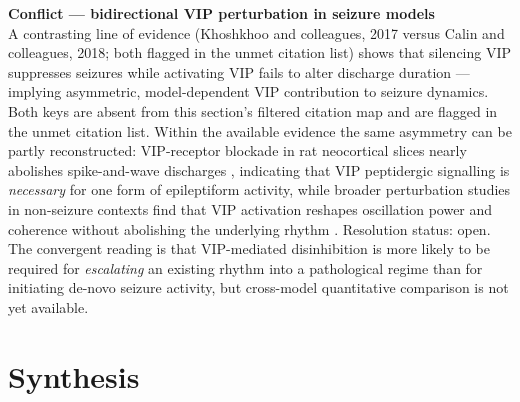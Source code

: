 \documentclass[11pt]{article}
\begin{document}
\begin{framed}
\textbf{Conflict --- bidirectional VIP perturbation in seizure models}\\
A contrasting line of evidence (Khoshkhoo and colleagues, 2017 versus Calin and colleagues, 2018; both flagged in the unmet citation list) shows that silencing VIP suppresses seizures while activating VIP fails to alter discharge duration --- implying asymmetric, model-dependent VIP contribution to seizure dynamics. Both keys are absent from this section's filtered citation map and are flagged in the unmet citation list. Within the available evidence the same asymmetry can be partly reconstructed: VIP-receptor blockade in rat neocortical slices nearly abolishes spike-and-wave discharges \citep{Hall2015}, indicating that VIP peptidergic signalling is \textit{necessary} for one form of epileptiform activity, while broader perturbation studies in non-seizure contexts find that VIP activation reshapes oscillation power and coherence without abolishing the underlying rhythm \citep{Veit2023, Bastos2023a, Sabri2024}. Resolution status: open. The convergent reading is that VIP-mediated disinhibition is more likely to be required for \textit{escalating} an existing rhythm into a pathological regime than for initiating de-novo seizure activity, but cross-model quantitative comparison is not yet available.
\end{framed}

\section{Synthesis}
\end{document}
